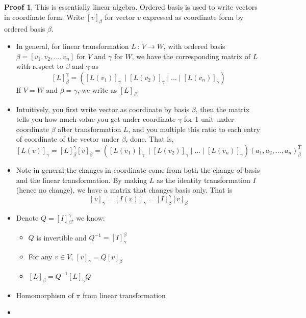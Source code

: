 \documentclass{book}
\theoremstyle{definition}
\theoremstyle{remarkstyle}
\newtheorem*{myproof}{Proof}%
\begin{document}
\begin{myproof}
    This is essentially linear algebra. Ordered basis is used to write vectors in coordinate form. Write $[v]_\beta $ for vector $v$ expressed as coordinate form by ordered basis $\beta$.
    \begin{itemize}
        \item In general, for linear transformation $L\,:\, V\rightarrow W$, with ordered basis $\beta = [v_1,v_2,\dots,v_n] $ for $V$ and $\gamma$ for $W$, we have the corresponding matrix of $L$ with respect to $\beta$ and $\gamma$ as 
        $$
        [L]^\gamma_\beta = \left( [L(v_1)]_\gamma\ \;\Big\vert\; [L(v_2)]_\gamma \;\Big\vert\; \dots \;\Big\vert\; [L(v_n)]_\gamma \right)
        $$
        If $V=W$ and $\beta = \gamma$, we write as $[L]_\beta $
        \item Intuitively, you first write vector as coordinate by basis $\beta$, then the matrix tells you how much value you get under coordinate $\gamma$ for 1 unit under coordinate $\beta$ after transformation $L$, and you multiple this ratio to each entry of coordinate of the vector under $\beta$, done. That is,
        $$
        [L(v)]_\gamma = [L]^\gamma_\beta[v]_\beta = \left( [L(v_1)]_\gamma\ \;\Big\vert\; [L(v_2)]_\gamma \;\Big\vert\; \dots \;\Big\vert\; [L(v_n)]_\gamma \right) (a_1, a_2, \dots, a_n)_\beta^T
        $$
        \item Note in general the changes in coordinate come from both the change of basis and the linear transformation. By making $L$ as the identity transformation $I$ (hence no change), we have a matrix that changes basis only. That is 
        $$
        [v]_\gamma = [I(v)]_\gamma = [I]^\gamma_\beta[v]_\beta
        $$
        \item Denote $Q = [I]^\gamma_\beta $, we know:
        \begin{itemize}
            \item $Q$ is invertible and $Q^{-1} = [I]^\beta_\gamma $
            \item For any $v\in V$, $[v]_\gamma = Q[v]_\beta $
            \item $[L]_\beta = Q^{-1}[L]_\gamma Q$
        \end{itemize}
        \item Homomorphism of $\pi$ from linear transformation
        \item[] 
    \end{itemize}
\end{myproof}
\end{document}
